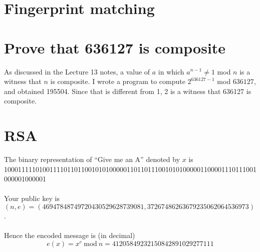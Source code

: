 \documentclass[11pt]{article}
\begin{document}
\section{Fingerprint matching} 

\section{Prove that 636127 is composite}
As discussed in the Lecture 13 notes, a value of $a$ in which $a^{n-1} \ne 1$ mod $n$ is a witness that $n$ is composite. I wrote a program to compute $2^{636127-1}$ mod $636127$, and obtained 195504. Since that is different from 1, 2 is a witness that 636127 is composite. 

\section{RSA}
The binary representation of ``Give me an A'' denoted by $x$ is \\
100011111010011110110110010101000001101101110010101000001100001110111001000001000001 \\
\\
Your public key is $(n,e) = (46947848749720430529628739081,37267486263679235062064536973)$. \\
\\
Hence the encoded message is (in decimal)
\begin{equation*}
e(x) = x^{e}\ \mbox{mod}\ n = 41205849232150842891029277111
\end{equation*}
\end{document}
